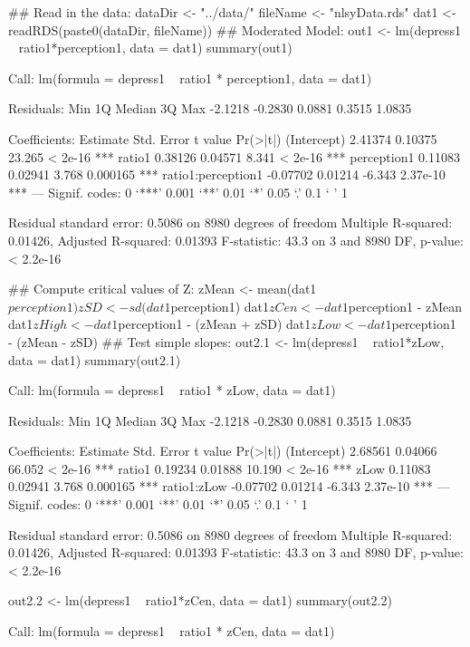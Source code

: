 \begin{Schunk}
\begin{Sinput}
 ## Read in the data:
 dataDir <- "../data/"
 fileName <- "nlsyData.rds"
 dat1 <- readRDS(paste0(dataDir, fileName))
 ## Moderated Model:
 out1 <- lm(depress1 ~ ratio1*perception1, data = dat1)
 summary(out1)
\end{Sinput}
\begin{Soutput}
Call:
lm(formula = depress1 ~ ratio1 * perception1, data = dat1)

Residuals:
    Min      1Q  Median      3Q     Max 
-2.1218 -0.2830  0.0881  0.3515  1.0835 

Coefficients:
                   Estimate Std. Error t value Pr(>|t|)    
(Intercept)         2.41374    0.10375  23.265  < 2e-16 ***
ratio1              0.38126    0.04571   8.341  < 2e-16 ***
perception1         0.11083    0.02941   3.768 0.000165 ***
ratio1:perception1 -0.07702    0.01214  -6.343 2.37e-10 ***
---
Signif. codes:  0 ‘***’ 0.001 ‘**’ 0.01 ‘*’ 0.05 ‘.’ 0.1 ‘ ’ 1

Residual standard error: 0.5086 on 8980 degrees of freedom
Multiple R-squared:  0.01426,	Adjusted R-squared:  0.01393 
F-statistic:  43.3 on 3 and 8980 DF,  p-value: < 2.2e-16
\end{Soutput}
\begin{Sinput}
 ## Compute critical values of Z:
 zMean <- mean(dat1$perception1)
 zSD <- sd(dat1$perception1)
 dat1$zCen <- dat1$perception1 - zMean 
 dat1$zHigh <- dat1$perception1 - (zMean + zSD)
 dat1$zLow <- dat1$perception1 - (zMean - zSD)
 ## Test simple slopes:
 out2.1 <- lm(depress1 ~ ratio1*zLow, data = dat1)
 summary(out2.1)
\end{Sinput}
\begin{Soutput}
Call:
lm(formula = depress1 ~ ratio1 * zLow, data = dat1)

Residuals:
    Min      1Q  Median      3Q     Max 
-2.1218 -0.2830  0.0881  0.3515  1.0835 

Coefficients:
            Estimate Std. Error t value Pr(>|t|)    
(Intercept)  2.68561    0.04066  66.052  < 2e-16 ***
ratio1       0.19234    0.01888  10.190  < 2e-16 ***
zLow         0.11083    0.02941   3.768 0.000165 ***
ratio1:zLow -0.07702    0.01214  -6.343 2.37e-10 ***
---
Signif. codes:  0 ‘***’ 0.001 ‘**’ 0.01 ‘*’ 0.05 ‘.’ 0.1 ‘ ’ 1

Residual standard error: 0.5086 on 8980 degrees of freedom
Multiple R-squared:  0.01426,	Adjusted R-squared:  0.01393 
F-statistic:  43.3 on 3 and 8980 DF,  p-value: < 2.2e-16
\end{Soutput}
\begin{Sinput}
 out2.2 <- lm(depress1 ~ ratio1*zCen, data = dat1)
 summary(out2.2)
\end{Sinput}
\begin{Soutput}
Call:
lm(formula = depress1 ~ ratio1 * zCen, data = dat1)


\end{Soutput}
\end{Schunk}
